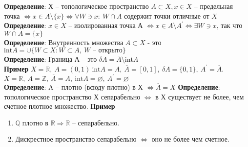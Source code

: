 	\textbf{Определение}: Х -- топологическое пространство $A\subset X, x\in X$ -- предельная точка $\Leftrightarrow x \in \overline{A\setminus\{x\}} \Leftrightarrow \forall W \ni x:\ W\cap A$ содержит точки отличные от $X$\\
	\textbf{Определение}: $x \in X$ -- изолированная точка А $\Leftrightarrow x \in A \setminus A^{\prime} \Leftrightarrow \exists W\ni x$, так что $W\cap A=\{x\}$\\
	\textbf{Определение}: Внутренность множества $A \subset X$ - это $\text{int}A = \cup\{ W\subset X: W\subset A,\ W \text{ -- открыто}\}$\\
	\textbf{Определение}: Граница А -- это $\delta A = \overline{A}\setminus \text{int}A$\\
	\textbf{Пример} $X = \mathbb{R},\ A = (0,1)\ \text{int}A = A,\ \overline{A} = [0,1],\ \delta A = \{0,1\},\ A^{\prime} = \overline{A}$. $X = \mathbb{R},\ A = \mathbb{Z},\ \overline{A} = A,\ \text{int}A = \varnothing,\ A^{\prime} = \varnothing$\\
	\textbf{Определение}: A -- плотно (всюду плотно) в Х $\Leftrightarrow \overline{A} =X$
	\textbf{Определение}: топологическое пространство Х сепарабельно $\Leftrightarrow$ в Х существует не более, чем счетное плотное множество. \textbf{Пример} 
	\begin{enumerate}
		\item 
		$\mathbb{Q}$ плотно в $\mathbb{R} \Rightarrow \mathbb{R}$ -- сепарабельно.
		\item 
		Дискрестное пространство сепарабельно $\Leftrightarrow$ оно не более чем счетное.
	\end{enumerate}
	

\newpage
